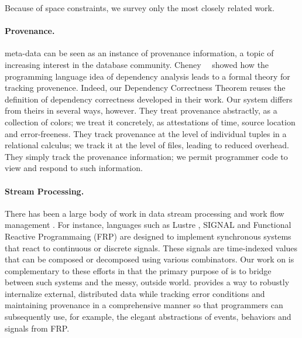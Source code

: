 
Because of space constraints, we survey only the most closely related work.

\paragraph*{Provenance.}  \padsd{} meta-data can be seen as
an instance of provenance information, a topic of increasing interest
in the database community.  Cheney~\etal{}~\cite{cheney-dbpl07} showed
how the programming language idea of dependency analysis leads to a
formal theory for tracking provenence.  Indeed, our Dependency
Correctness Theorem reuses the definition of dependency correctness
developed in their work.  Our system differs from theirs in several
ways, however.  They treat provenance abstractly, as a collection of
colors; we treat it concretely, as attestations of time, source
location and error-freeness.  They track provenance at the level of
individual tuples in a relational calculus; we track it at the level
of files, leading to reduced overhead.  They simply track the
provenance information; we permit programmer code to view and
respond to such information.

\paragraph*{Stream Processing.}
There has been a large body of work in data stream processing and work
flow management \cite{Golab03}. For instance, languages such as Lustre
\cite{CaspiPHP87}, SIGNAL \cite{AmagbegnonBG95} and Functional
Reactive Programmaing (FRP) \cite{ElliottH97,WanH00} are designed to
implement synchronous systems that react to continuous or discrete
signals. These signals are time-indexed values that can be composed or
decomposed using various combinators.  Our work on \padsd{} is
complementary to these efforts in that the primary purpose of \padsd{}
is to bridge between such systems and the messy, outside
world.  \padsd{} provides a way to robustly internalize external,
distributed data while tracking error conditions and maintaining
provenance in a comprehensive manner so that programmers can
subsequently use, for 
example, the elegant abstractions of events, behaviors and signals
from FRP.


